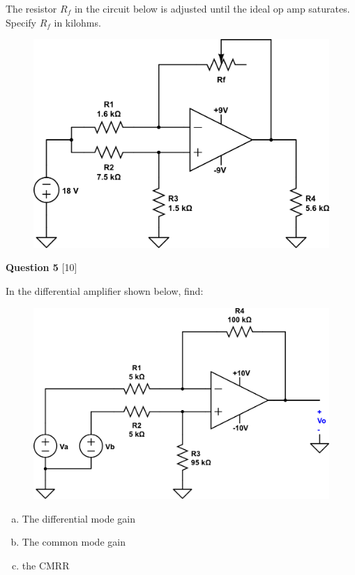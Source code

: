 \documentclass[12pt]{article}
\begin{document}
The resistor $R_f$ in the circuit below is adjusted until the ideal op amp saturates. Specify $R_f$ in kilohms.

\begin{figure}[h!]
\begin{center}
 \includegraphics[scale=0.4]{p5_26.png}
\end{center}
\end{figure}

\newpage

{\bf Question 5} [10] %

In the differential amplifier shown below, find:

\begin{figure}[h!]
\begin{center}
 \includegraphics[scale=0.4]{p5_32.png}
\end{center}
\end{figure}

\begin{enumerate}[(a)]
\item The differential mode gain
\item The common mode gain
\item the CMRR
\end{enumerate}
\end{document}
